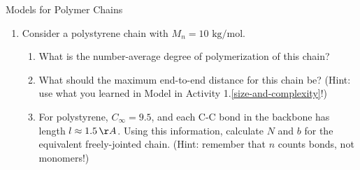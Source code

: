 \begin{activity}{Models for Polymer Chains}
\begin{exercises}
\begin{enumerate}
			\item Consider a polystyrene chain with $M_n=10\text{ kg/mol}$.
			
				\begin{enumerate}
					\item What is the number-average degree of polymerization of this chain?
				
				\begin{solution}\end{solution}
				
					\item What should the maximum end-to-end distance for this chain be?  (Hint: use what you learned in Model \label{size-and-complexity:mdl:polyethylenesize} in Activity 1.\ref{size-and-complexity}!)
				
				\begin{solution}\end{solution}
					
					\item For polystyrene, $C_\infty=9.5$, and each C-C bond in the backbone has length $l\approx 1.5\,\AA$.  Using this information, calculate $N$ and $b$ for the equivalent freely-jointed chain. (Hint: remember that $n$ counts bonds, not monomers!)
				
				\begin{solution}\end{solution}
				

\end{enumerate}
\end{enumerate}
\end{exercises}
\end{activity}
